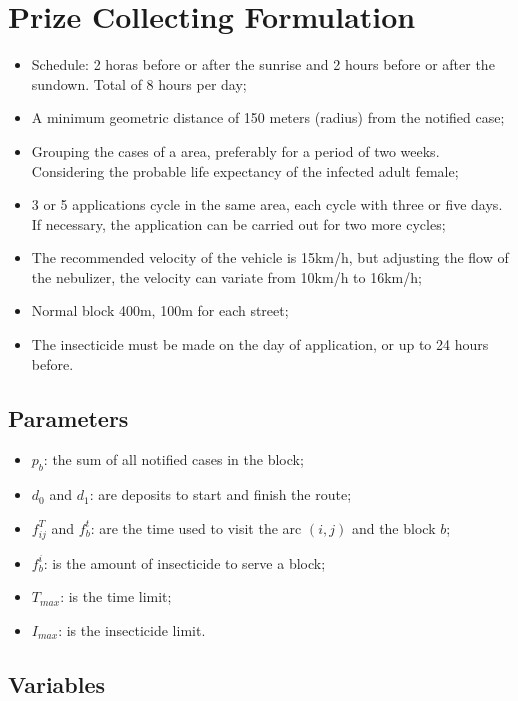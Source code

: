 \documentclass[a4paper,11pt]{article}
\begin{document}
\section{Prize Collecting Formulation} \label{sec:formulation}

\begin{itemize}
    \item Schedule: 2 horas before or after the sunrise and 2 hours before or after the sundown. Total of 8 hours per day;
    \item A minimum geometric distance of 150 meters (radius) from the notified case; 
    \item Grouping the cases of a area, preferably for a period of two weeks. Considering the probable life expectancy of the infected adult female;
    \item 3 or 5 applications cycle in the same area, each cycle with three or five days. If necessary, the application can be carried out for two more cycles;
    \item The recommended velocity of the vehicle is 15km/h, but adjusting the flow of the nebulizer, the velocity can variate from 10km/h to 16km/h;
    \item Normal block 400m, 100m for each street;
    \item The insecticide must be made on the day of application, or up to 24 hours before.
\end{itemize}

\subsection{Parameters}
\begin{itemize}
    \item $p_b$: the sum of all notified cases in the block;
    \item $d_0$ and $d_1$: are deposits to start and finish the route;
    \item $f^T_{ij}$ and $f^t_{b}$: are the time used to visit the arc $(i, j)$ and the block $b$;
    \item $f^i_{b}$: is the amount of insecticide to serve a block;
    \item $T_{max}$: is the time limit;
    \item $I_{max}$: is the insecticide limit.
\end{itemize}


\subsection{Variables}
\end{document}
